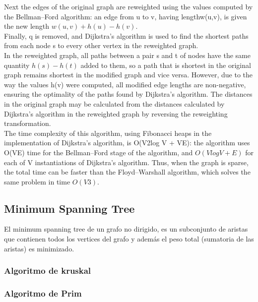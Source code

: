 \documentclass[10pt,letterpaper,twocolumn,twosided]{article}
\newcommand{\codigofuente}[1]{

\dotfill
}
\begin{document}
Next the edges of the original graph are reweighted using the values computed by the Bellman–Ford algorithm: 
an edge from u to v, having lengthw(u,v), is given the new length $ w(u,v) + h(u) - h(v).$\\

Finally, q is removed, and Dijkstra's algorithm is used to find the shortest paths from each node s to every
other vertex in the reweighted graph.\\

In the reweighted graph, all paths between a pair s and t of nodes have the same quantity $h(s) - h(t)$ added to
them, so a path that is shortest in the original graph remains shortest in the modified graph and vice versa.
However, due to the way the values h(v) were computed, all modified edge lengths are non-negative, ensuring the
optimality of the paths found by Dijkstra's algorithm. The distances in the original graph may be calculated from 
the distances calculated by Dijkstra's algorithm in the reweighted graph by reversing the reweighting transformation.\\

The time complexity of this algorithm, using Fibonacci heaps in the implementation of Dijkstra's algorithm, 
is O(V2log V + VE): the algorithm uses O(VE) time for the Bellman–Ford stage of the algorithm, and $O(V log V + E)$
for each of V instantiations of Dijkstra's algorithm. Thus, when the graph is sparse, the total time can be faster
than the Floyd–Warshall algorithm, which solves the same problem in time $ O(V3).$\\

\subsection{Minimum Spanning Tree}
El minimum spanning tree de un grafo no dirigido, es un subconjunto de aristas que contienen todos los vertices del grafo y además el peso total (sumatoria de las aristas) es minimizado.

\subsubsection{Algoritmo de kruskal}

\codigofuente{src/graphs/kruskal.cpp}

\subsubsection{Algoritmo de Prim}
\end{document}
